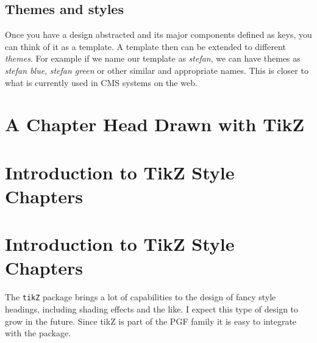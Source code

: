 \section{Themes and styles}

Once you have a design abstracted and its major components defined as keys, you can think of it as a template. A template then can be extended to different \textit{themes}. For example if we name our template as \textit{stefan}, we can have themes as \textit{stefan blue}, \textit{stefan green} or other similar and appropriate names. This is closer to what is currently used in CMS systems on the web.

\begin{tcblisting}{}
\end{tcblisting}




\pagestyle{chapterstyle}



\pagestyle{chapterstyle}

\@specialtrue
\clearpage
{}
\chapter{A Chapter Head Drawn with TikZ}

\lipsum[1-3]

\clearpage



\chapter{Introduction to TikZ Style Chapters}
\chapter{Introduction to TikZ Style Chapters}
The \lstinline{tikZ} package brings a lot of capabilities to the design of fancy style headings, including shading effects and the like. I expect this type of design to grow in the future. Since tikZ is part of the PGF family it is easy to integrate with the package.

